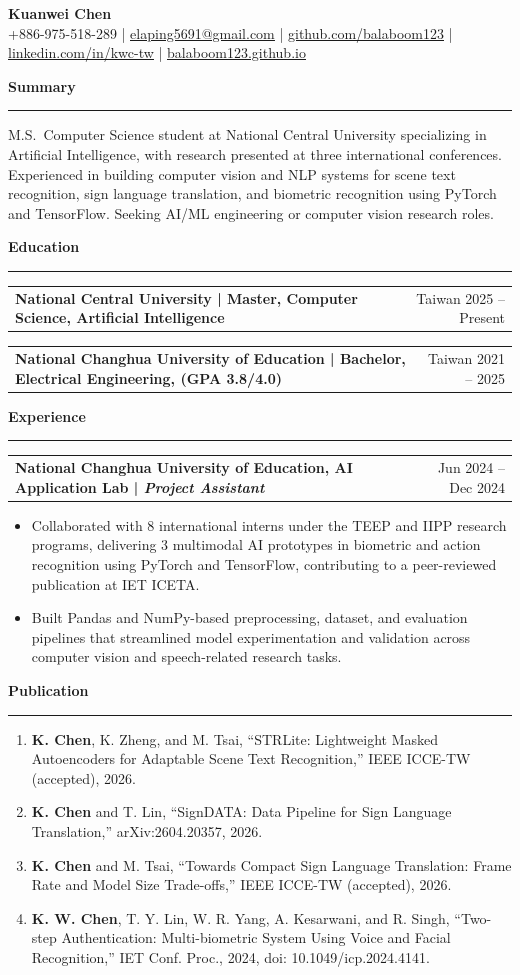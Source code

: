 \documentclass[10pt,a4paper]{article}
\makeatletter
\newcommand{\sectiontitle}[1]{%
  \vspace{5pt}
  {\large\textbf{#1}}\par
  \vspace{1.5pt}
  \hrule
  \vspace{2pt}
}
\newcommand{\cventryshort}[2]{%
  \begin{tabularx}{\textwidth}{@{}Xr@{}}
    {\small\textbf{#1}} & {\small{#2}} \\
  \end{tabularx}
  \par
}
\newcommand{\educationentry}[2]{%
  \begin{tabularx}{\textwidth}{@{}Xr@{}}
    {\small\textbf{#1}} & {\small{#2}} \\
  \end{tabularx}
  \par
}
\makeatother
\begin{document}
\begin{center}
  {\LARGE\textbf{Kuanwei Chen}}\\[2pt]
  \small
  +886-975-518-289 \;|\;
  \href{mailto:elaping5691@gmail.com}{\uline{elaping5691@gmail.com}} \;|\;
  \href{https://github.com/balaboom123}{\uline{github.com/balaboom123}} \;|\;
  \href{https://www.linkedin.com/in/kwc-tw/}{\uline{linkedin.com/in/kwc-tw}} \;|\;
  \href{https://balaboom123.github.io/}{\uline{balaboom123.github.io}}
\end{center}

\sectiontitle{Summary}
M.S.\ Computer Science student at National Central University specializing in Artificial Intelligence, with research presented at three international conferences.
Experienced in building computer vision and NLP systems for scene text recognition, sign language translation, and biometric recognition using PyTorch and TensorFlow.
Seeking AI/ML engineering or computer vision research roles.

\sectiontitle{Education}
\educationentry
  {National Central University | Master, Computer Science, Artificial Intelligence}
  {Taiwan  2025 -- Present}
\vspace{1pt}
\educationentry
  {National Changhua University of Education | Bachelor, Electrical Engineering, (GPA 3.8/4.0)}
  {Taiwan  2021 -- 2025}

\sectiontitle{Experience}
\cventryshort
  {National Changhua University of Education, AI Application Lab | \textit{Project Assistant}}
  {Jun 2024 -- Dec 2024}
\begin{itemize}
  \item Collaborated with 8 international interns under the TEEP and IIPP research programs, delivering 3 multimodal AI prototypes in biometric and action recognition using PyTorch and TensorFlow, contributing to a peer-reviewed publication at IET ICETA.
  \item Built Pandas and NumPy-based preprocessing, dataset, and evaluation pipelines that streamlined model experimentation and validation across computer vision and speech-related research tasks.
\end{itemize}

\sectiontitle{Publication}
\begin{enumerate}[label={\arabic*.}]
  \item \textbf{K. Chen}, K. Zheng, and M. Tsai, ``STRLite: Lightweight Masked Autoencoders for Adaptable Scene Text Recognition,'' IEEE ICCE-TW (accepted), 2026.
  \item \textbf{K. Chen} and T. Lin, ``SignDATA: Data Pipeline for Sign Language Translation,'' arXiv:2604.20357, 2026.
  \item \textbf{K. Chen} and M. Tsai, ``Towards Compact Sign Language Translation: Frame Rate and Model Size Trade-offs,'' IEEE ICCE-TW (accepted), 2026.
  \item \textbf{K. W. Chen}, T. Y. Lin, W. R. Yang, A. Kesarwani, and R. Singh, ``Two-step Authentication: Multi-biometric System Using Voice and Facial Recognition,'' IET Conf. Proc., 2024, doi: 10.1049/icp.2024.4141.
\end{enumerate}
\end{document}
